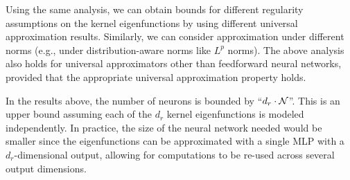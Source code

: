 Using the same analysis, we can obtain bounds for different regularity assumptions on the kernel eigenfunctions by using different universal approximation results. Similarly, we can consider approximation under different norms (e.g., under distribution-aware norms like $L^p$ norms). The above analysis also holds for universal approximators other than feedforward neural networks, provided that the appropriate universal approximation property holds.

\begin{remark}
	In the results above, the number of neurons is bounded by ``$d_r \cdot {\mathcal{N}}$''. This is an upper bound assuming each of the $d_r$ kernel eigenfunctions is modeled independently. In practice, the size of the neural network needed would be smaller since the eigenfunctions can be approximated with a single MLP with a $d_r$-dimensional output, allowing for computations to be re-used across several output dimensions. %
\end{remark}


